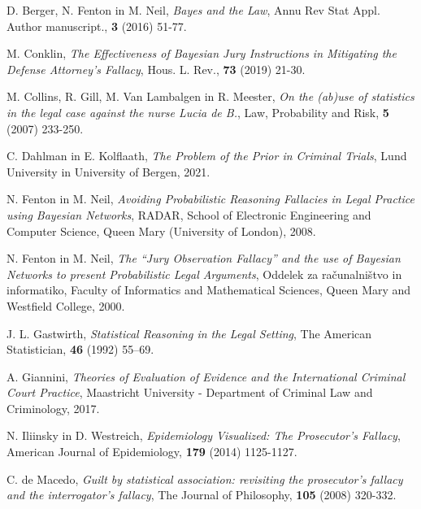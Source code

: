 \documentclass{beamer}
\begin{document}
\begin{frame}
    \begin{thebibliography}{99}
        D. Berger, N. Fenton in M. Neil, \emph{Bayes and the Law}, Annu Rev Stat Appl. Author manuscript., \textbf{3} (2016) 51-77.

        M. Conklin, \emph{The Effectiveness of Bayesian Jury Instructions in Mitigating the Defense Attorney's Fallacy}, Hous. L. Rev., \textbf{73} (2019) 21-30.

        M. Collins, R. Gill, M. Van Lambalgen in R. Meester, \emph{On the (ab)use of statistics in the legal case against the nurse Lucia de B.}, Law, Probability and Risk, \textbf{5} (2007) 233-250.

        C. Dahlman in E. Kolflaath, \emph{The Problem of the Prior in Criminal Trials}, Lund University in University of Bergen, 2021.

        N. Fenton in M. Neil, \emph{Avoiding Probabilistic Reasoning Fallacies in Legal Practice using Bayesian Networks}, RADAR, School of Electronic Engineering and Computer Science, Queen Mary (University of London), 2008.
    \end{thebibliography}
\end{frame}

\begin{frame}
    \begin{thebibliography}{99}
        N. Fenton in M. Neil, \emph{The “Jury Observation Fallacy” and the use of Bayesian Networks to present Probabilistic Legal Arguments}, Oddelek za računalništvo in informatiko, Faculty of Informatics and Mathematical Sciences, Queen Mary and Westfield College, 2000.

        J. L. Gastwirth, \emph{Statistical Reasoning in the Legal Setting}, The American Statistician, \textbf{46} (1992) 55–69.

        A. Giannini, \emph{Theories of Evaluation of Evidence and the International Criminal Court Practice}, Maastricht University - Department of Criminal Law and Criminology, 2017.

        N. Iliinsky in D. Westreich, \emph{Epidemiology Visualized: The Prosecutor’s Fallacy}, American Journal of Epidemiology, \textbf{179} (2014) 1125-1127.

        C. de Macedo, \emph{Guilt by statistical association: revisiting the prosecutor’s fallacy and the interrogator’s fallacy}, The Journal of Philosophy, \textbf{105} (2008) 320-332.
    \end{thebibliography}
\end{frame}
\end{document}
